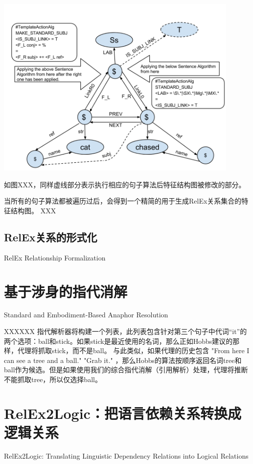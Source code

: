 \includegraphics[width=12cm]{figures/revisedFeatureStructure_1.png}

如图XXX，同样虚线部分表示执行相应的句子算法后特征结构图被修改的部分。


当所有的句子算法都被遍历过后，会得到一个精简的用于生成RelEx关系集合的特征结构图。
XXX

\subsection{RelEx关系的形式化}{RelEx Relationship Formalization}


\section{基于涉身的指代消解}{Standard and Embodiment-Based Anaphor Resolution}


XXXXXX
指代解析器将构建一个列表，此列表包含针对第三个句子中代词“it”的两个选项：ball和stick。如果stick是最近使用的名词，那么正如Hobbs建议的那样，代理将抓取stick，而不是ball。
与此类似，如果代理的历史包含
"From here I can see a tree and a ball."
"Grab it."
，那么Hobbs的算法按顺序返回名词tree和ball作为候选。但是如果使用我们的综合指代消解（引用解析）处理，代理将推断不能抓取tree，所以仅选择ball。


\section{RelEx2Logic：把语言依赖关系转换成逻辑关系}{RelEx2Logic: Translating Linguistic Dependency Relations into Logical Relations}

